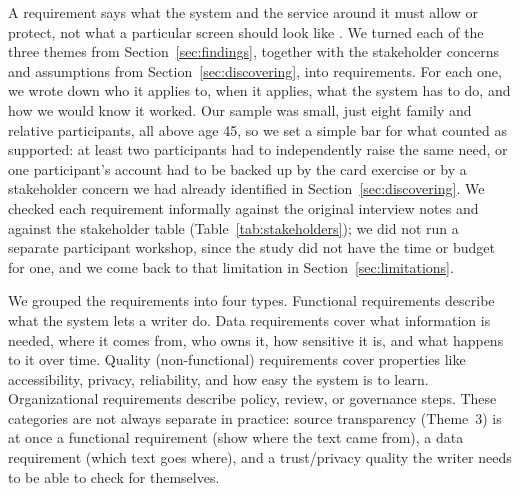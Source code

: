 \documentclass[sigconf,nonacm]{acmart}
\begin{document}
A requirement says what the system and the service around it must allow or
protect, not what a particular screen should look like
\cite{preece2023interaction}. We turned each of the three themes from
Section~\ref{sec:findings}, together with the stakeholder concerns and
assumptions from Section~\ref{sec:discovering}, into requirements. For each
one, we wrote down who it applies to, when it applies, what the system has
to do, and how we would know it worked. Our sample was small, just eight
family and relative participants, all above age 45, so we set a simple bar
for what counted as supported: at least two participants had to
independently raise the same need, or one participant's account had to be
backed up by the card exercise or by a stakeholder concern we had already
identified in Section~\ref{sec:discovering}. We checked each requirement
informally against the original interview notes and against the stakeholder
table (Table~\ref{tab:stakeholders}); we did not run a separate participant
workshop, since the study did not have the time or budget for one, and we
come back to that limitation in Section~\ref{sec:limitations}.

We grouped the requirements into four types. Functional requirements
describe what the system lets a writer do. Data requirements cover what
information is needed, where it comes from, who owns it, how sensitive it
is, and what happens to it over time. Quality (non-functional) requirements
cover properties like accessibility, privacy, reliability, and how easy the
system is to learn. Organizational requirements describe policy, review, or
governance steps. These categories are not always separate in practice:
source transparency (Theme~3) is at once a functional requirement (show
where the text came from), a data requirement (which text goes where), and a
trust/privacy quality the writer needs to be able to check for themselves.
\end{document}
